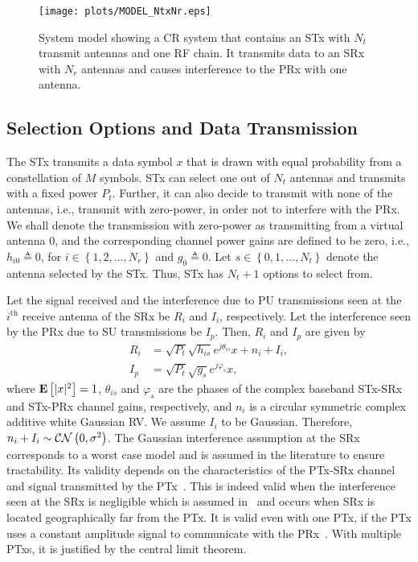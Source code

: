 \documentclass[12pt,draftcls,peerreview,onecolumn]{IEEEtran}
\newcommand{\CN}{{\cal CN}}
\newcommand{\define}{\triangleq}
\newcommand{\ie}{{i.e.}}
\newcommand{\expect}[1]{{\bf{E}}\left[{#1}\right]}
\newcommand{\nx}{{0}}
\newcommand{\Nt}{{N_t}}
\newcommand{\Nr}{{N_r}}
\newcommand{\Pt}{{P_t}}
\newcommand{\such}{h}
\newcommand{\puch}{g}
\newcommand{\hk}[1]{{\such_{#1}}}
\newcommand{\gk}[1]{{\puch_{#1}}}
\newcommand{\Rsrx}{R_{i}}
\newcommand{\Iprx}{I_{p}}
\newcommand{\Isrx}{I_{i}}
\newcommand{\noise}{n_i}
\newcommand{\noisevar}{\sigma^2}
\newcommand{\allopts}{\left\{\nx,1,\ldots,\Nt\right\}}
\newcommand{\nropts}{\left\{1,2,\ldots,\Nr\right\}}
\newcommand{\suchph}{\theta}
\newcommand{\puchph}{\varphi}
\newcommand{\thetahk}{\suchph_{is}}
\newcommand{\thetagk}{\puchph_{s}}
\newcommand{\ith}{i^{\text{th}}}
\begin{document}
\begin{figure}
\centering 
\texttt{[image: plots/MODEL\_NtxNr.eps]}
\caption{System model showing a CR system that contains an STx with $\Nt$ transmit antennas and one RF chain. It transmits data to an SRx with $\Nr$ antennas and causes interference to the PRx with one antenna.}
\label{fig:MODEL}
\end{figure}
\newcommand{\hs}{\mathbf{\such}_{s}}
\newcommand{\hsstar}{\mathbf{\such}_{s^{*}}}
\subsection{Selection Options and Data Transmission}
The STx transmits a data symbol $x$ that is drawn with equal probability from a constellation of $M$ symbols. STx can select one out of $\Nt$ antennas and transmits with a fixed power $\Pt$. Further, it can also decide to transmit with none of the antennas, \ie, transmit with zero-power, in order not to interfere with the PRx. We shall denote the transmission with zero-power as transmitting from a virtual antenna $\nx$, and the corresponding channel power gains are defined to be zero, \ie, $\hk{i\nx} \define 0$, for $i\in\nropts$ and $\gk{\nx}\define 0$. Let $s\in\allopts$ denote the antenna selected by the STx. Thus, STx has $\Nt+1$ options to select from. 

Let the signal received and the interference due to PU transmissions seen at the $\ith$ receive antenna of the SRx be $\Rsrx$ and $\Isrx$, respectively. Let the interference seen by the PRx due to SU transmissions be $\Iprx$. Then, $\Rsrx$ and $\Iprx$ are given by
%
\begin{align}
\label{eq:r_su}
 \Rsrx &= \sqrt{\Pt}\sqrt{\hk{is}} e^{j\thetahk}x + \noise + \Isrx, \\
 \label{eq:i}
 \Iprx &= \sqrt{\Pt}\sqrt{\gk{s}} e^{j\thetagk}x ,
\end{align}
%
where $\expect{|x|^2}=1$, $\thetahk$ and $\thetagk$ are the phases of the complex baseband STx-SRx and STx-PRx channel gains, respectively, and $\noise$ is a circular symmetric complex additive white Gaussian RV. We assume $\Isrx$ to be Gaussian. Therefore, $\noise + \Isrx\sim \CN\left(0,\noisevar\right)$. The Gaussian interference assumption at the SRx corresponds to a worst case model and is assumed in the literature to ensure tractability. Its validity depends on the characteristics of the PTx-SRx channel and signal transmitted by the PTx~\cite{Kashyap_2014_TCOM}. This is indeed valid when the interference seen at the SRx is negligible which is assumed in~\cite{Zhou_2008_IET,Zhou_2009_WCNC,musavian_2009_tcom,RZhang_2009_TWC,li_2011_pimrc,Sboui_2013_TWC} and occurs when SRx is located geographically far from the PTx. It is valid even with one PTx, if the PTx uses a constant amplitude signal to communicate with the PRx~\cite{Kashyap_2014_TCOM}. With multiple PTxs, it is justified by the central limit theorem. 
\end{document}
